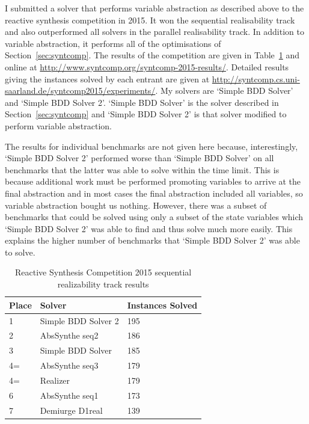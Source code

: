 I submitted a solver that performs variable abstraction as described above to the reactive synthesis competition in 2015. It won the sequential realisability track and also outperformed all solvers in the parallel realisability track. In addition to variable abstraction, it performs all of the optimisations of Section~\ref{sec:syntcomp}. The results of the competition are given in Table~\ref{tab:syntcomp_res} and online at \url{http://www.syntcomp.org/syntcomp-2015-results/}. Detailed results giving the instances solved by each entrant are given at \url{http://syntcomp.cs.uni-saarland.de/syntcomp2015/experiments/}. My solvers are `Simple BDD Solver' and `Simple BDD Solver 2'. `Simple BDD Solver' is the solver described in Section~\ref{sec:syntcomp} and `Simple BDD Solver 2' is that solver modified to perform variable abstraction. 

The results for individual benchmarks are not given here because, interestingly, `Simple BDD Solver 2' performed worse than `Simple BDD Solver' on all benchmarks that the latter was able to solve within the time limit. This is because additional work must be performed promoting variables to arrive at the final abstraction and in most cases the final abstraction included all variables, so variable abstraction bought us nothing. However, there was a subset of benchmarks that could be solved using only a subset of the state variables which `Simple BDD Solver 2' was able to find and thus solve much more easily. This explains the higher number of benchmarks that `Simple BDD Solver 2' was able to solve.

\begin{table}
\centering
\begin{tabular}{| l | l | l |}
    \hline
    Place & Solver & Instances Solved \\
    \hline
    1  & Simple BDD Solver 2 & 195 \\
    2  & AbsSynthe seq2      & 186 \\
    3  & Simple BDD Solver   & 185 \\
    4= & AbsSynthe seq3      & 179 \\
    4= & Realizer            & 179 \\
    6  & AbsSynthe seq1      & 173 \\
    7  & Demiurge D1real     & 139 \\
    \hline
\end{tabular}
\caption{Reactive Synthesis Competition 2015 sequential realizability track results}
\label{tab:syntcomp_res}
\end{table}

